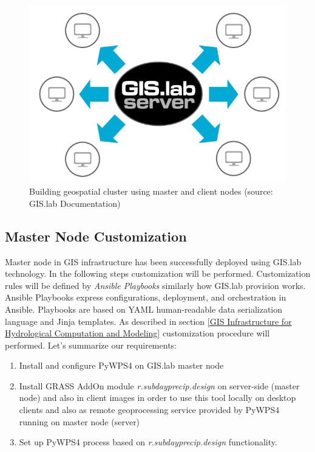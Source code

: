 \documentclass{isprs}
\begin{document}
\begin{figure}[ht!]
\begin{center}
  \includegraphics[width=1.0\columnwidth]{figures/gislab-machines-launch.png}
  \caption{Building geospatial cluster using master and client nodes
    (source: GIS.lab Documentation)}
\label{fig:gislab_infrastructure}
\end{center}
\end{figure}

\subsection{Master Node Customization}

Master node in GIS infrastructure has been successfully deployed using
GIS.lab technology. In the following steps customization will be
performed. Customization rules will be defined by \textit{Ansible
  Playbooks} \cite{shah2015ansible} similarly how GIS.lab provision
works. Ansible Playbooks express configurations, deployment, and
orchestration in Ansible. Playbooks are based on YAML human-readable
data serialization language and Jinja templates. As described in
section \ref{GIS Infrastructure for Hydrological Computation and
  Modeling} customization procedure will performed. Let's summarize
our requirements:

\begin{enumerate}
\setlength\itemsep{0em}\setlength\parskip{0em}\setlength\topsep{0em}\setlength\partopsep{0em}\setlength\parsep{0em}
\item{Install and configure PyWPS4 on GIS.lab master node}
\item{Install GRASS AddOn module \textit{r.subdayprecip.design} on
    server-side (master node) and also in client images in order to
    use this tool locally on desktop clients and also as remote
    geoprocessing service provided by PyWPS4 running on master node
    (server)}
\item{Set up PyWPS4 process based on \textit{r.subdayprecip.design}
  functionality.}
\end{enumerate}
\end{document}
